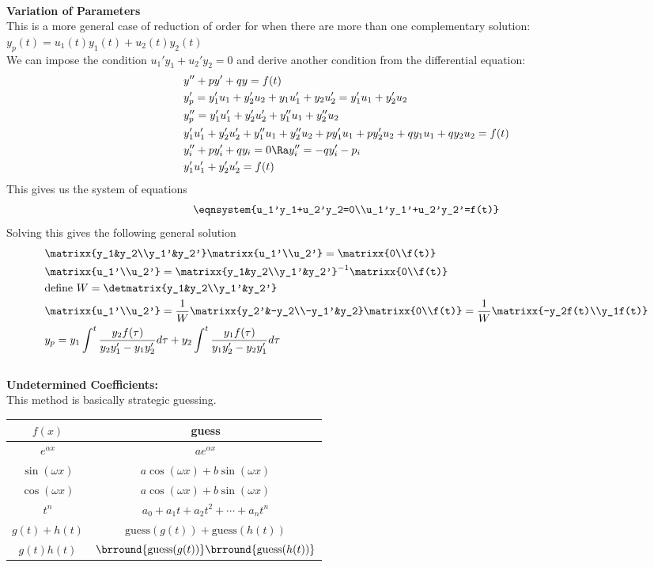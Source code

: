 \\
\textbf{Variation of Parameters}\\
This is a more general case of reduction of order for when there are more than one complementary solution:\\
$y_p(t)=u_1(t)y_1(t)+u_2(t)y_2(t)$\\
We can impose the condition $u_1'y_1+u_2'y_2=0$ and derive another condition from the differential equation:
\begin{align*}
    &y''+py'+qy=f(t)\\
    &y_p'=y_1'u_1+y_2'u_2+y_1u_1'+y_2u_2'=y_1'u_1+y_2'u_2\\
    &y_p''=y_1'u_1'+y_2'u_2'+y_1''u_1+y_2''u_2\\
    &y_1'u_1'+y_2'u_2'+y_1''u_1+y_2''u_2+py_1'u_1+py_2'u_2+qy_1u_1+qy_2u_2=f(t)\\
    &y_i''+py_i'+qy_i=0\Ra y_i''=-qy_i'-p_i\\
    &y_1'u_1'+y_2'u_2'=f(t)
\end{align*}
This gives us the system of equations
$$\eqnsystem{u_1'y_1+u_2'y_2=0\\u_1'y_1'+u_2'y_2'=f(t)}$$
Solving this gives the following general solution
\begin{align*}
    &\matrixx{y_1&y_2\\y_1'&y_2'}\matrixx{u_1'\\u_2'}=\matrixx{0\\f(t)}\\
    &\matrixx{u_1'\\u_2'}=\matrixx{y_1&y_2\\y_1'&y_2'}^{-1}\matrixx{0\\f(t)}\\
    &\text{define }W=\detmatrix{y_1&y_2\\y_1'&y_2'}\\
    &\matrixx{u_1'\\u_2'}=\frac{1}{W}\matrixx{y_2'&-y_2\\-y_1'&y_2}\matrixx{0\\f(t)}=\frac{1}{W}\matrixx{-y_2f(t)\\y_1f(t)}\\
    &y_p=y_1\int^t\frac{y_2f(\tau)}{y_2y_1'-y_1y_2'}d\tau+y_2\int^t\frac{y_1f(\tau)}{y_1y_2'-y_2y_1'}d\tau
\end{align*}\\
\textbf{Undetermined Coefficients:}\\
This method is basically strategic guessing.\\
\begin{tabular}{c|c}
    $f(x)$ & guess\\
    \hline
    $e^{\alpha x}$ & $ae^{\alpha x}$\\
    $\sin(\omega x)$ & $a\cos(\omega x)+b\sin(\omega x)$\\
    $\cos(\omega x)$ & $a\cos(\omega x)+b\sin(\omega x)$\\
    $t^n$ & $a_0+a_1t+a_2t^2+\cdots+a_nt^n$\\
    $g(t)+h(t)$ & $\text{guess}(g(t))+\text{guess}(h(t))$\\
    $g(t)h(t)$ & $\brround{\text{guess}(g(t))}\brround{\text{guess}(h(t))}$
\end{tabular}\\
